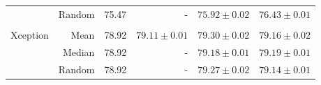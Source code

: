 \documentclass{elsarticle}
\begin{document}
\begin{table}[h]
\begin{tabular}{rrrrrr}
		               &       Random &    75.47 &                 - &  $75.92 \pm 0.02$ &  $76.43 \pm 0.01$ \\
		               &              &          &                   &                   &                   \\
		      Xception &         Mean &    78.92 &  $79.11 \pm 0.01$ &  $\mathbf{79.30 \pm 0.02}$ &  $79.16 \pm 0.02$ \\
		               &       Median &    78.92 &                 - &  $79.18 \pm 0.01$ &  $79.19 \pm 0.01$ \\
		               &       Random &    78.92 &                 - &  $79.27 \pm 0.02$ &   $79.14\pm 0.01$ \\ \bottomrule
	\end{tabular}
	\label{tab:results1}
	\end{table}
\end{document}
